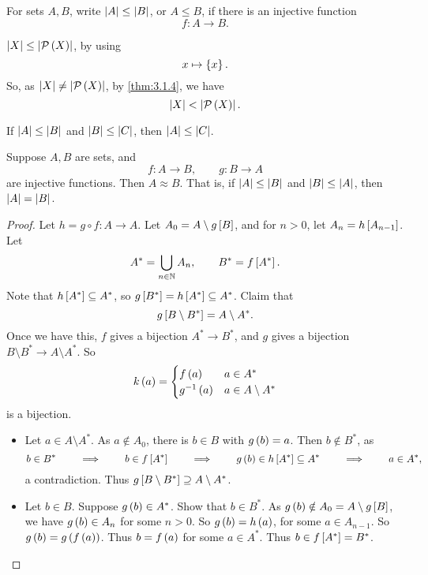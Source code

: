 
\begin{definition}
For sets $ A, B $, write $ \abs{A} \le \abs{B} $, or $ A \le B $, if there is an injective function
$$ f : A \to B. $$
\end{definition}

\begin{note*}
$ \abs{X} \le \abs{\PP\rb{X}} $, by using
$$ x \mapsto \cb{x}. $$
So, as $ \abs{X} \ne \abs{\PP\rb{X}} $, by \ref{thm:3.1.4}, we have
$$ \abs{X} < \abs{\PP\rb{X}}. $$
\end{note*}

\begin{example*}
If $ \abs{A} \le \abs{B} $ and $ \abs{B} \le \abs{C} $, then $ \abs{A} \le \abs{C} $.
\end{example*}

\begin{theorem}
\label{thm:3.1.6}
Suppose $ A, B $ are sets, and
$$ f : A \to B, \qquad g : B \to A $$
are injective functions. Then $ A \approx B $. That is, if $ \abs{A} \le \abs{B} $ and $ \abs{B} \le \abs{A} $, then $ \abs{A} = \abs{B} $.
\end{theorem}

\pagebreak

\begin{proof}
Let $ h = g \circ f : A \to A $. Let $ A_0 = A \setminus g\sb{B} $, and for $ n > 0 $, let $ A_n = h\sb{A_{n - 1}} $. Let
$$ A^* = \bigcup_{n \in \N} A_n, \qquad B^* = f\sb{A^*}. $$
Note that $ h\sb{A^*} \subseteq A^* $, so $ g\sb{B^*} = h\sb{A^*} \subseteq A^* $. Claim that
$$ g\sb{B \setminus B^*} = A \setminus A^*. $$
Once we have this, $ f $ gives a bijection $ A^* \to B^* $, and $ g $ gives a bijection $ B \setminus B^* \to A \setminus A^* $. So
$$ k\rb{a} =
\begin{cases}
f\rb{a} & a \in A^* \\
g^{-1}\rb{a} & a \in A \setminus A^*
\end{cases}
$$
is a bijection.
\begin{itemize}
\item Let $ a \in A \setminus A^* $. As $ a \notin A_0 $, there is $ b \in B $ with $ g\rb{b} = a $. Then $ b \notin B^* $, as
$$ b \in B^* \qquad \implies \qquad b \in f\sb{A^*} \qquad \implies \qquad g\rb{b} \in h\sb{A^*} \subseteq A^* \qquad \implies \qquad a \in A^*, $$
a contradiction. Thus $ g\sb{B \setminus B^*} \supseteq A \setminus A^* $.
\item Let $ b \in B $. Suppose $ g\rb{b} \in A^* $. Show that $ b \in B^* $. As $ g\rb{b} \notin A_0 = A \setminus g\sb{B} $, we have $ g\rb{b} \in A_n $ for some $ n > 0 $. So $ g\rb{b} = h\rb{a} $, for some $ a \in A_{n - 1} $. So $ g\rb{b} = g\rb{f\rb{a}} $. Thus $ b = f\rb{a} $ for some $ a \in A^* $. Thus $ b \in f\sb{A^*} = B^* $.
\end{itemize}
\end{proof}

